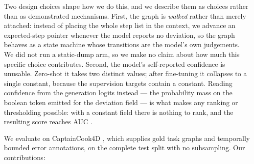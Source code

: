 \documentclass[10pt,twocolumn]{article}
\begin{document}
Two design choices shape how we do this, and we describe them as choices rather
than as demonstrated mechanisms. First, the graph is \emph{walked} rather than
merely attached: instead of placing the whole step list in the context, we
advance an expected-step pointer whenever the model reports no deviation, so the
graph behaves as a state machine whose transitions are the model's own
judgements. We did not run a static-dump arm, so we make no claim about how much
this specific choice contributes. Second, the model's self-reported confidence
is unusable. Zero-shot it takes two distinct values; after fine-tuning it
collapses to a single constant, because the supervision targets contain a
constant. Reading confidence from the generation logits instead --- the
probability mass on the boolean token emitted for the deviation field --- is what
makes any ranking or thresholding possible: with a constant field there is
nothing to rank, and the resulting score reaches AUC \resAUC{}.

We evaluate on CaptainCook4D \citep{peddi2024captaincook4d}, which supplies gold
task graphs and temporally bounded error annotations, on the complete test split
with no subsampling. Our contributions:
\end{document}
